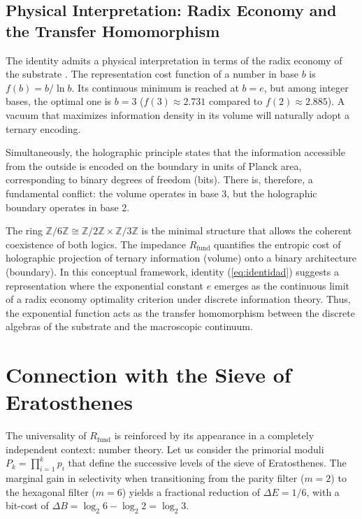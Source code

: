 \documentclass[10pt,a4paper]{article}
\newcommand{\Rfund}{R_{\text{fund}}}
\begin{document}
\subsection{Physical Interpretation: Radix Economy and the Transfer Homomorphism}

The identity admits a physical interpretation in terms of the radix economy of the substrate \cite{Hayes2001}.
The representation cost function of a number in base \(b\) is \(f(b) = b/\ln b\).
Its continuous minimum is reached at \(b = e\), but among integer bases, the optimal one is \(b = 3\) (\(f(3) \approx 2.731\) compared to \(f(2) \approx 2.885\)).
A vacuum that maximizes information density in its volume will naturally adopt a ternary encoding.

Simultaneously, the holographic principle \cite{tHooft1993, Bekenstein1973} states that the information accessible from the outside is encoded on the boundary in units of Planck area, corresponding to binary degrees of freedom (bits).
There is, therefore, a fundamental conflict: the volume operates in base 3, but the holographic boundary operates in base 2.

The ring \(\mathbb{Z}/6\mathbb{Z} \cong \mathbb{Z}/2\mathbb{Z} \times \mathbb{Z}/3\mathbb{Z}\) is the minimal structure that allows the coherent coexistence of both logics.
The impedance \(\Rfund\) quantifies the entropic cost of holographic projection of ternary information (volume) onto a binary architecture (boundary).
In this conceptual framework, identity (\ref{eq:identidad}) suggests a representation where the exponential constant \(e\) emerges as the continuous limit of a radix economy optimality criterion under discrete information theory. Thus, the exponential function acts as the transfer homomorphism between the discrete algebras of the substrate and the macroscopic continuum.

\section{Connection with the Sieve of Eratosthenes}
\label{sec:eratosthenes}

The universality of \(\Rfund\) is reinforced by its appearance in a completely independent context: number theory.
Let us consider the primorial moduli \(P_k = \prod_{i=1}^k p_i\) that define the successive levels of the sieve of Eratosthenes.
The marginal gain in selectivity when transitioning from the parity filter (\(m=2\)) to the hexagonal filter (\(m=6\)) yields a fractional reduction of \(\Delta E = 1/6\), with a bit-cost of \(\Delta B = \log_2 6 - \log_2 2 = \log_2 3\).
\end{document}
